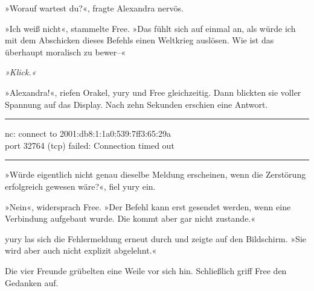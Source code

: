 »Worauf wartest du?«, fragte Alexandra nervös.

»Ich weiß nicht«, stammelte Free. »Das fühlt sich auf einmal an, als würde ich mit dem Abschicken dieses Befehls einen Weltkrieg auslösen. Wie ist das überhaupt moralisch zu bewer–«

\textit{»Klick.«}

»Alexandra!«, riefen Orakel, yury und Free gleichzeitig. Dann blickten sie voller Spannung auf das Display. Nach zehn Sekunden erschien eine Antwort.

\noindent \parbox{\textwidth}{ \vspace{3ex} \hrule \vspace{3ex}

    \begin{footnotesize}
    \begin{ttfamily}

\noindent nc: connect to 2001:db8:1:1a0:539:7ff3:65:29a\\
\noindent port 32764 (tcp) failed: Connection timed out

    \end{ttfamily}
    \end{footnotesize}

\vspace{3ex} \hrule \vspace{3ex} }

»Würde eigentlich nicht genau dieselbe Meldung erscheinen, wenn die Zerstörung erfolgreich gewesen wäre?«, fiel yury ein.

»Nein«, widersprach Free. »Der Befehl kann erst gesendet werden, wenn eine Verbindung aufgebaut wurde. Die kommt aber gar nicht zustande.«

yury las sich die Fehlermeldung erneut durch und zeigte auf den Bildschirm. »Sie wird aber auch nicht explizit abgelehnt.«

Die vier Freunde grübelten eine Weile vor sich hin. Schließlich griff Free den Gedanken auf.

